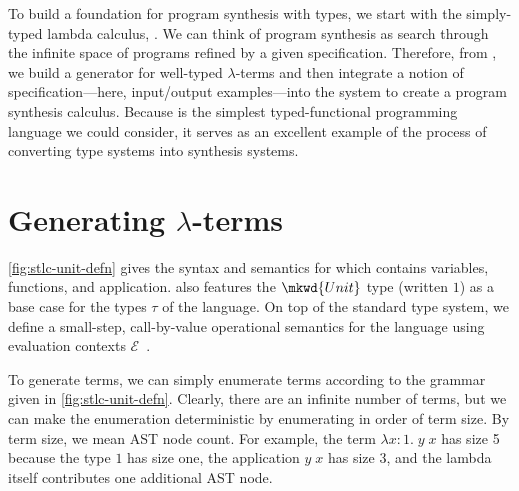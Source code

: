 
To build a foundation for program synthesis with types, we start with the simply-typed lambda calculus, \stlcu{}.
We can think of program synthesis as search through the infinite space of programs refined by a given specification.
Therefore, from \stlcu{}, we build a generator for well-typed $λ$-terms and then integrate a notion of specification---here, input/output examples---into the system to create a program synthesis calculus.
Because \stlcu{} is the simplest typed-functional programming language we could consider, it serves as an excellent example of the process of converting type systems into synthesis systems.



\section{Generating \texorpdfstring{$λ$}{λ}-terms}

\autoref{fig:stlc-unit-defn} gives the syntax and semantics for \stlcu{} which contains variables, functions, and application.
\stlcu{} also features the $\mkwd{Unit}$ type (written $1$) as a base case for the types $τ$ of the language.
On top of the standard type system, we define a small-step, call-by-value operational semantics for the language using evaluation contexts $ℰ$~.

To generate \stlcu{} terms, we can simply enumerate terms according to the grammar given in \autoref{fig:stlc-unit-defn}.
Clearly, there are an infinite number of terms, but we can make the enumeration deterministic by enumerating in order of term size.
By term size, we mean AST node count.  For example, the term $λx{:}1.\;y\;x$ has size 5 because the type $1$ has size one, the application $y\;x$ has size 3, and the lambda itself contributes one additional AST node.

